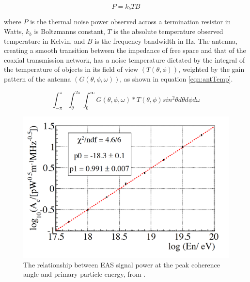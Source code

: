 \begin{equation}
	\label{eqn:NyquistNoise}
	P = k_{b}TB
\end{equation}

\noindent where $P$ is the thermal noise power observed across a termination resistor in Watts, $k_{b}$ is Boltzmanns constant, $T$ is the absolute temperature observed temperature in Kelvin, and $B$ is the frequency bandwidth in Hz.  The antenna, creating a smooth transition between the impedance of free space and that of the coaxial transmission network, has a noise temperature dictated by the integral of the temperature of objects in its field of view $(T(\theta,\phi))$, weighted by the gain pattern of the antenna $(G(\theta,\phi,\omega))$, as shown in equation \ref{eqn:antTemp}.

\begin{equation}
	\label{eqn:antTemp}
	\int_{-\pi}^{\pi}\int_{\theta}^{2\pi}\int_{0}^{\infty} G(\theta,\phi,\omega)*T(\theta,\phi)sin^{2}\theta d\theta d\phi d\omega
\end{equation}


\begin{figure}
\centering
	\includegraphics[width=\textwidth]{figures/EASSignalPower}
	\caption{The relationship between EAS signal power at the peak coherence angle and primary particle energy, from \cite{EnergyEstimator}.}
	\label{fig:EASSignalPower}
\end{figure}

